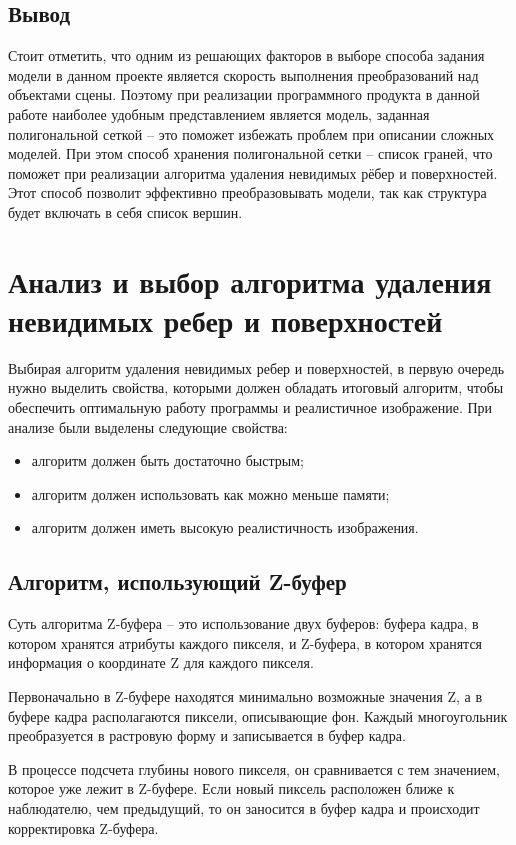 \subsection*{Вывод}
Стоит отметить, что одним из решающих факторов в выборе способа задания модели в данном проекте является скорость выполнения преобразований над объектами сцены. Поэтому при реализации программного продукта в данной работе наиболее удобным представлением является модель, заданная полигональной сеткой – это поможет избежать проблем при описании сложных моделей. При этом способ хранения полигональной сетки -- список граней, что поможет при реализации алгоритма удаления невидимых рёбер и поверхностей. Этот способ позволит эффективно преобразовывать модели, так как структура будет включать в себя список вершин. 


\section{Анализ и выбор алгоритма удаления \\ невидимых ребер и поверхностей}

Выбирая алгоритм удаления невидимых ребер и поверхностей, в первую очередь нужно выделить свойства, которыми должен обладать итоговый алгоритм, чтобы обеспечить оптимальную работу программы и реалистичное изображение. При анализе были выделены следующие свойства:
\begin{itemize}
\item	алгоритм должен быть достаточно быстрым;
\item	алгоритм должен использовать как можно меньше памяти;
\item	алгоритм должен иметь высокую реалистичность изображения.
\end{itemize}

\subsection{Алгоритм, использующий Z-буфер}
Суть алгоритма Z-буфера \cite{zbufer} -- это использование двух буферов: буфера
кадра, в котором хранятся атрибуты каждого пикселя, и Z-буфера, в котором
хранятся информация о координате Z для каждого пикселя.

Первоначально в Z-буфере находятся минимально возможные значения
Z, а в буфере кадра располагаются пиксели, описывающие фон. Каждый
многоугольник преобразуется в растровую форму и записывается в буфер
кадра.

В процессе подсчета глубины нового пикселя, он сравнивается с тем
значением, которое уже лежит в Z-буфере. Если новый пиксель расположен
ближе к наблюдателю, чем предыдущий, то он заносится в буфер кадра и
происходит корректировка Z-буфера.

